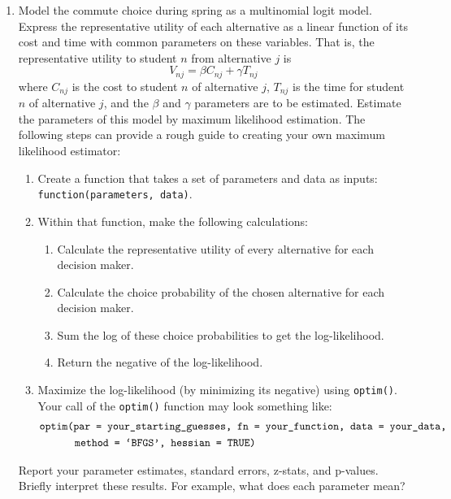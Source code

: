 \documentclass[11pt,letterpaper]{article}\usepackage[]{graphicx}\usepackage[]{xcolor}
\begin{document}
\begin{enumerate}[label=\alph*., leftmargin=*]
	\item Model the commute choice during spring as a multinomial logit model. Express the representative utility of each alternative as a linear function of its cost and time with common parameters on these variables. That is, the representative utility to student $n$ from alternative $j$ is
	$$V_{nj} = \beta C_{nj} + \gamma T_{nj}$$
	where $C_{nj}$ is the cost to student $n$ of alternative $j$, $T_{nj}$ is the time for student $n$ of alternative $j$, and the $\beta$ and $\gamma$ parameters are to be estimated. Estimate the parameters of this model by maximum likelihood estimation. The following steps can provide a rough guide to creating your own maximum likelihood estimator:
	\begin{enumerate}[label=\Roman*.]
		\item Create a function that takes a set of parameters and data as inputs: \texttt{function(parameters, data)}.
		\item Within that function, make the following calculations:
		\begin{enumerate}[label=\roman*.]
			\item Calculate the representative utility of every alternative for each decision maker.
			\item Calculate the choice probability of the chosen alternative for each decision maker.
			\item Sum the log of these choice probabilities to get the log-likelihood.
			\item Return the negative of the log-likelihood.
		\end{enumerate}
		\item Maximize the log-likelihood (by minimizing its negative) using \texttt{optim()}. Your call of the \texttt{optim()} function may look something like:
		\begin{align*}
			&\text{\texttt{optim(par = your\_starting\_guesses, fn = your\_function, data = your\_data,}} \\
			& \qquad \quad \; \text{\texttt{method = `BFGS', hessian = TRUE)}}
		\end{align*}
	\end{enumerate}
	Report your parameter estimates, standard errors, z-stats, and p-values. Briefly interpret these results. For example, what does each parameter mean?


\end{enumerate}
\end{document}
